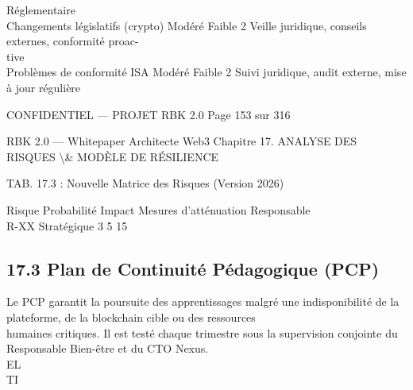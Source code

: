 \documentclass[12pt,landscape,a4paper]{article}
\newenvironment{confidential}
{\begin{tcolorbox}[
    colback=rbkred!5!white,
    colframe=rbkred!75!black,
    title=CONFIDENTIEL,
    fonttitle=\bfseries\color{white},
    coltitle=rbkred!75!black,
    breakable,
    enhanced,
    frame hidden,
    borderline west={2pt}{0pt}{rbkred!75!black}
]}
{\end{tcolorbox}}
\begin{document}
Réglementaire\\
Changements législatifs (crypto)                     Modéré     Faible        2    Veille juridique, conseils externes, conformité proac-\\
tive\\
Problèmes de conformité ISA                          Modéré     Faible        2    Suivi juridique, audit externe, mise à jour régulière\\
\vspace{0.5em}
\vspace{0.5em}
\vspace{0.5em}
\begin{confidential}CONFIDENTIEL — PROJET RBK 2.0                              Page 153 sur 316\end{confidential}
RBK 2.0 — Whitepaper Architecte Web3                                        Chapitre 17. ANALYSE DES RISQUES \textbackslash{}& MODÈLE DE RÉSILIENCE\\
\vspace{0.5em}
\vspace{0.5em}
\begin{center}\begin{tabular}TAB. 17.3 : Nouvelle Matrice des Risques (Version 2026)\end{tabular}\end{center}
\vspace{0.5em}
\vspace{0.5em}
Risque Probabilité Impact Mesures d’atténuation Responsable\\
R-XX   Stratégique 3      5                     15\\
\vspace{0.5em}
\vspace{0.5em}
\vspace{0.5em}
\vspace{0.5em}
\subsection{17.3 Plan de Continuité Pédagogique (PCP)}
Le PCP garantit la poursuite des apprentissages malgré une indisponibilité de la plateforme, de la blockchain cible ou des ressources\\
humaines critiques. Il est testé chaque trimestre sous la supervision conjointe du Responsable Bien-être et du CTO Nexus.\\
\vspace{0.5em}
\vspace{0.5em}
\vspace{0.5em}
\vspace{0.5em}
EL\\
TI\\
\end{document}

